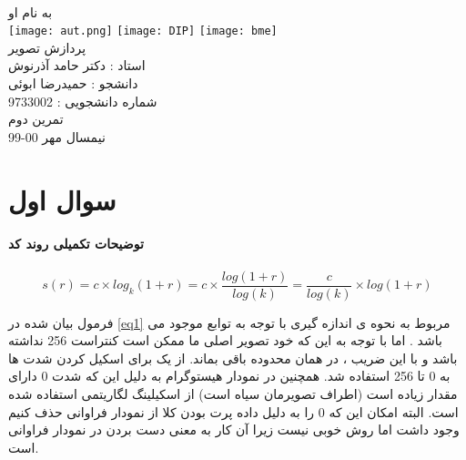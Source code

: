 \documentclass[12pt]{article}
\begin{document}
	\doublespacing
	\begin{titlepage}
		\paragraph*{}
		\centering
			
			
			{\small به نام او}\\
			\vspace{1cm}
			\texttt{[image: aut.png]}
			\hspace{1cm}
			\texttt{[image: DIP]}
			\hspace{1cm}
			\texttt{[image: bme]}\\
			\vspace{2cm}
			{\Huge پردازش تصویر}\\
			\vspace{2cm}
			{\large استاد : دکتر حامد آذرنوش}\\
			\vspace{0.5cm}
			{\small  دانشجو :‌ حمیدرضا ابوئی}\\
			\vspace{0.5cm}
			{\small شماره دانشجویی : 9733002}\\
			\vspace{0.5cm}
			{\small تمرین دوم}\\
			\vfill
			{\tiny نیمسال مهر 00-99}
	\end{titlepage}
	\thispagestyle{plain}
	\tableofcontents
	\newpage
	\doublespacing
	\section{سوال اول}
		\paragraph{توضیحات تکمیلی روند کد}
		\begin{equation}
		\label{eq1}
			s(r) = c \times log_k(1+r) = c \times \frac{log(1+r)}{log(k)} = \frac{c}{log(k)} \times log(1+r)
		\end{equation}
		
		فرمول بیان شده در 
		\ref{eq1}
		مربوط به نحوه ی اندازه گیری با توجه به توابع موجود می باشد . اما با توجه به این که خود تصویر اصلی ما ممکن است کنتراست 256 نداشته باشد و با این ضریب ، در همان محدوده باقی بماند. از یک
		برای اسکیل کردن شدت ها به 0 تا 256 استفاده شد.
		همچنین در نمودار هیستوگرام به دلیل این که شدت 0 دارای مقدار زیاده است (اطراف تصویرمان سیاه است) از اسکیلینگ لگاریتمی استفاده شده است. البته امکان این که 0 را به دلیل داده پرت بودن کلا از نمودار فراوانی حذف کنیم وجود داشت اما روش خوبی نیست زیرا آن کار به معنی دست بردن در نمودار فراوانی است. 
		
\end{document}
